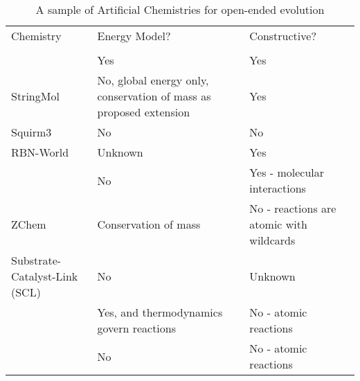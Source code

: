 \begin{table}
	\scriptsize
	\caption{A sample of Artificial Chemistries for open-ended evolution}
	\label{tab1}
	\begin{tabular}{@{}p{4cm}p{4.5cm}p{4.5cm}@{}}
		\hline\noalign{\smallskip}
		Chemistry                                                          & Energy Model?                                                      & Constructive?                            \\ 
		\\ \noalign{\smallskip}
		\hline
		\noalign{\smallskip}
		\cite{Ducharme2012}                                                & Yes                                                                & Yes                                      \\
		StringMol \parencite{Hickinbotham2012}                             & No, global energy only, conservation of mass as proposed extension & Yes                                      \\
		Squirm3 \parencite{Hutton2002,Lucht2012}                           & No                                                                 & No                                       \\
		RBN-World \parencite{Faulconbridge2011}                            & Unknown                                                            & Yes                                      \\
		\cite{Lenaerts2009}                                                & No                                                                 & Yes - molecular interactions             \\
		ZChem \parencite{Tominaga2009}                                     & Conservation of mass                                               & No - reactions are atomic with wildcards \\
		Substrate-Catalyst-Link (SCL) \parencite{Varela:1974qd,Suzuki2008} & No                                                                 & Unknown                                  \\
		\cite{Fernando:2008xy,Fernando:2007pf}                             & Yes, and thermodynamics govern reactions                           & No - atomic reactions                    \\
		\cite{Gardiner2007}                                                & No                                                                 & No - atomic reactions                    \\

\end{tabular}
\end{table}
